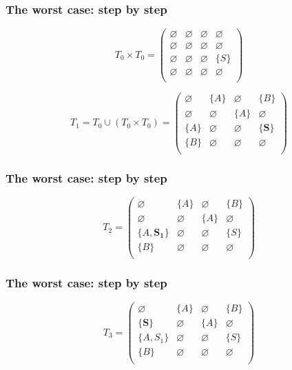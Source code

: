 \documentclass[xcolor=table]{beamer}
\begin{document}
\begin{frame}[noframenumbering]
  \frametitle{The worst case: step by step}
\begin{figure}[h]
\[
T_0 \times T_0 = \begin{pmatrix}
	\varnothing & \varnothing & \varnothing & \varnothing \\
	\varnothing & \varnothing & \varnothing & \varnothing \\
	\varnothing & \varnothing & \varnothing & \{S\}       \\
	\varnothing & \varnothing & \varnothing & \varnothing \\
\end{pmatrix}
\]

\[
T_1 = T_0 \cup (T_0 \times T_0) = \begin{pmatrix}
	\varnothing & \{A\}       & \varnothing & \{B\}       \\
	\varnothing & \varnothing & \{A\}       & \varnothing \\
	\{A\}       & \varnothing & \varnothing & \{\pmb{S}\}       \\
	\{B\}       & \varnothing & \varnothing & \varnothing \\
\end{pmatrix}
\]
\label{ExampleQueryFirstIteration}
\end{figure}
\end{frame}

\begin{frame}[noframenumbering]
  \frametitle{The worst case: step by step}
\begin{figure}[h]
\[
T_2 = \begin{pmatrix}
    \varnothing & \{A\}       & \varnothing & \{B\}       \\
    \varnothing & \varnothing & \{A\}       & \varnothing \\
    \{A, \pmb{S_1}\}  & \varnothing & \varnothing & \{S\}       \\
    \{B\}       & \varnothing & \varnothing & \varnothing \\
\end{pmatrix}
\]
\label{ExampleQueryFirstIteration}
\end{figure}
\end{frame}

\begin{frame}[noframenumbering]
  \frametitle{The worst case: step by step}
\begin{figure}[h]
\[
T_3 = \begin{pmatrix}
\varnothing & \{A\}       & \varnothing & \{B\}       \\
\{\pmb{S}\}       & \varnothing & \{A\}       & \varnothing \\
\{A, S_1\}  & \varnothing & \varnothing & \{S\}       \\
\{B\}       & \varnothing & \varnothing & \varnothing \\
\end{pmatrix}
\]
\label{ExampleQueryFirstIteration}
\end{figure}
\end{frame}
\end{document}
